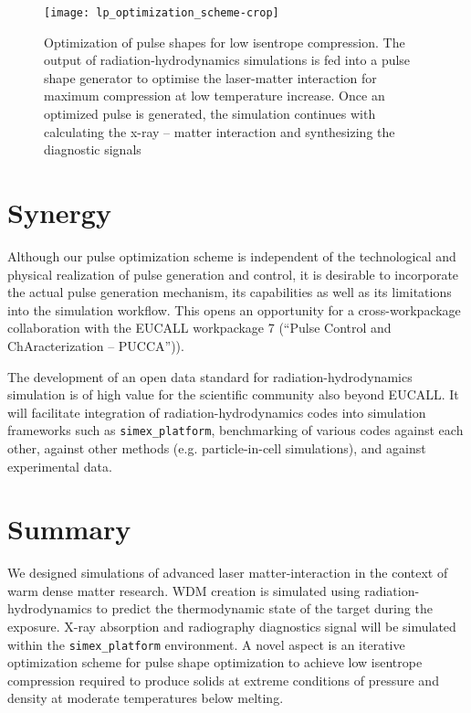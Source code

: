 \documentclass[10pt]{scrartcl}
\begin{document}
\begin{figure}[ht]
  \begin{center}
    \texttt{[image: lp\_optimization\_scheme-crop]}
  \end{center}
  \caption{Optimization of pulse shapes for low isentrope compression. The
  output of radiation-hydrodynamics simulations is fed into a pulse shape
generator to optimise the laser-matter interaction for maximum compression at
low temperature increase. Once an optimized pulse is generated, the simulation
continues with calculating the x-ray -- matter interaction and synthesizing the
diagnostic signals}
  \label{fig:lp_optimization_schem}
\end{figure}

\section{Synergy}

Although our pulse optimization scheme is  independent of the technological and
physical realization of pulse generation and control, it is desirable to
incorporate the actual pulse generation mechanism, its capabilities as well as
its limitations into the simulation workflow.  This opens an opportunity for
a cross-workpackage collaboration with the EUCALL workpackage 7 (``Pulse Control and
ChAracterization -- PUCCA'')).

The development of an open data standard for radiation-hydrodynamics simulation is of high value for the scientific community
also beyond EUCALL. It will facilitate integration of radiation-hydrodynamics codes into simulation frameworks such as
\texttt{simex\_platform}, benchmarking of various codes against each other, against other methods (e.g. particle-in-cell simulations), and
against experimental data.

\section{Summary}
We designed simulations of advanced laser matter-interaction in the context of warm dense matter research. WDM creation is
simulated using radiation-hydrodynamics to predict the thermodynamic state of
the target during the exposure. X-ray absorption and radiography diagnostics
signal will be simulated within the \texttt{simex\_platform} environment. A
novel aspect is an iterative optimization scheme for pulse shape optimization to
achieve low isentrope compression required to produce solids at extreme
conditions of pressure and density at moderate temperatures below melting.

%
\newpage
%
\printbibliography
\end{document}
